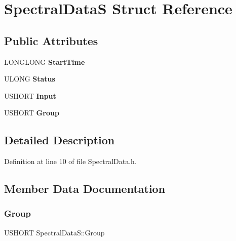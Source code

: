 \hypertarget{struct_spectral_data_s}{}\section{Spectral\+DataS Struct Reference}
\label{struct_spectral_data_s}
\subsection*{Public Attributes}
\begin{DoxyCompactItemize}
\item 
\mbox{\label{struct_spectral_data_s_ae0b259b3b13d97e38a5844aed6028a0d}} 
L\+O\+N\+G\+L\+O\+NG {\bfseries Start\+Time}
\item 
\mbox{\label{struct_spectral_data_s_acd76ae3549c00e79d15b7dd806a9dcdc}} 
U\+L\+O\+NG {\bfseries Status}
\item 
\mbox{\label{struct_spectral_data_s_a26f617790cc88a0fcb5aa9fe4c8e2c03}} 
U\+S\+H\+O\+RT {\bfseries Input}
\item 
\mbox{\label{struct_spectral_data_s_abe3361e075adbe14a8893ca93aa262ee}} 
U\+S\+H\+O\+RT {\bfseries Group}
\end{DoxyCompactItemize}


\subsection{Detailed Description}


Definition at line 10 of file Spectral\+Data.\+h.



\subsection{Member Data Documentation}
\mbox{\label{struct_spectral_data_s_abe3361e075adbe14a8893ca93aa262ee}} 
\subsubsection{\texorpdfstring{Group}{Group}}
{\footnotesize\ttfamily U\+S\+H\+O\+RT Spectral\+Data\+S\+::\+Group}



